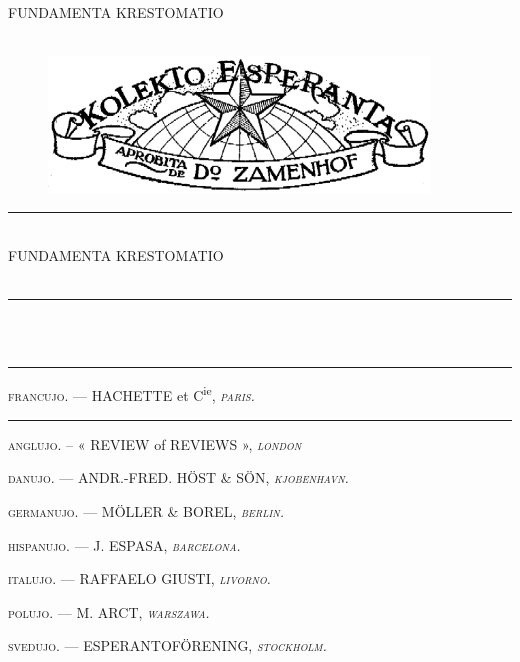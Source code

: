 \documentclass[a5paper,11pt,openany,twoside]{book}
\begin{document}
\frontmatter

%
%
\vspace*{\fill}
\begin{center}
\nicefont
 {\LARGE FUNDAMENTA KRESTOMATIO}\\[0.8cm]
 {\large {}}\\[0.8cm]
 {}
\end{center}
\vspace*{\fill}
\cleardoublepage

%
%
\thispagestyle{empty}
\begin{center}
 \begin{figure}[!ht]
 \centering \includegraphics[width=0.9\textwidth]{../graphics/terglobo.png}
 \end{figure}
 \nicefont
 
 {\large {}}

 \rule{13mm}{0.4pt}\\[1cm]

 {\LARGE FUNDAMENTA KRESTOMATIO}\\[0.8cm]
 {}\\[0.8cm]
 {}


 \rule[0.5ex]{13mm}{0.4pt} \\
 {\small {}}\\
 \rule[0.7ex]{13mm}{0.4pt}


\csfont \footnotesize

\textsc{francujo.} — HACHETTE et C\textsuperscript{ie}, \textsc{\textit{paris.}}

\rule[0.9ex]{13mm}{0.4pt}

\textsc{anglujo.} – « REVIEW of REVIEWS », \textsc{\textit{london}}

\textsc{danujo.} — ANDR.-FRED. HÖST \& SÖN, \textsc{\textit{kjobenhavn.}}

\textsc{germanujo.} — MÖLLER \& BOREL, \textsc{\textit{berlin.}}

\textsc{hispanujo.} — J. ESPASA, \textsc{\textit{barcelona.}}

\textsc{italujo.} — RAFFAELO GIUSTI, \textsc{\textit{livorno.}}

\textsc{polujo.} — M. ARCT, \textsc{\textit{warszawa.}}

\textsc{svedujo.} — ESPERANTOFÖRENING, \textsc{\textit{stockholm.}}

\end{center}
 
\end{document}
